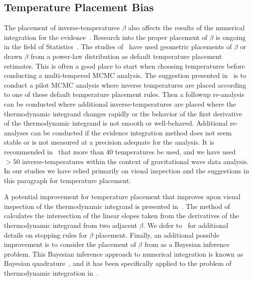 \subsection{Temperature Placement Bias}
The placement of inverse-temperatures $\beta$ also affects the results of the numerical integration for the evidence~\citep{lartillot2006computing, xie2010improving}. Research into the proper placement of $\beta$ is ongoing in the field of Statistics~\citep{calderhead2009estimating, annis2019thermodynamic}. The studies of~\cite{friel2008marginal, xie2010improving, Russel:2018pqv} have used geometric placements of $\beta$ or drawn $\beta$ from a power-law distribution as default temperature placement estimates. This is often a good place to start when choosing temperatures before conducting a multi-tempered MCMC analysis. The suggestion presented in~\cite{liu2016evaluating, de2013comparison, annis2019thermodynamic} is to conduct a pilot MCMC analysis where inverse temperatures are placed according to one of these default temperature placement rules. Then a followup re-analysis can be conducted where additional inverse-temperatures are placed where the thermodynamic integrand changes rapidly or the behavior of the first derivative of the thermodynamic integrand is not smooth or well-behaved. Additional re-analyses can be conducted if the evidence integration method does not seem stable or is not measured at a precision adequate for the analysis. It is recommended in~\cite{annis2019thermodynamic} that more than $40$ temperatures be used, and we have used $>50$ inverse-temperatures within the context of gravitational wave data analysis. In our studies we have relied primarily on visual inspection and the suggestions in this paragraph for temperature placement.

A potential improvement for temperature placement that improves upon visual inspection of the thermodynamic integrand is presented in~\cite{friel2014improving}. The method of ~\cite{friel2014improving} calculates the intersection of the linear slopes taken from the derivatives of the thermodynamic integrand from two adjacent $\beta$. We defer to~\cite{friel2014improving} for additional details on stopping rules for $\beta$ placement. Finally, an additional possible improvement is to consider the placement of $\beta$ from as a Bayesian inference problem. This Bayesian inference approach to numerical integration is known as Bayesian quadrature~\cite{diaconis1988bayesian}, and it has been specifically applied to the problem of thermodynamic integration in~\cite{briol2015probabilistic}.

